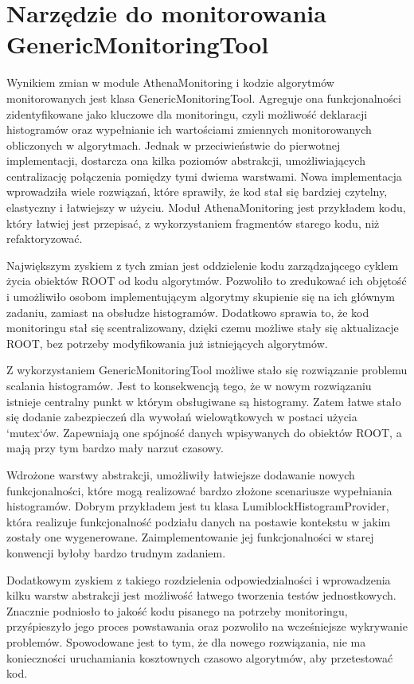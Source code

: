 \section{Narzędzie do monitorowania GenericMonitoringTool}
Wynikiem zmian w module AthenaMonitoring i kodzie algorytmów monitorowanych jest klasa GenericMonitoringTool.
Agreguje ona funkcjonalności zidentyfikowane jako kluczowe dla monitoringu, czyli możliwość deklaracji histogramów oraz wypełnianie ich wartościami zmiennych monitorowanych obliczonych w algorytmach.
Jednak w przeciwieństwie do pierwotnej implementacji, dostarcza ona kilka poziomów abstrakcji, umożliwiających centralizację połączenia pomiędzy tymi dwiema warstwami.
Nowa implementacja wprowadziła wiele rozwiązań, które sprawiły, że kod stał się bardziej czytelny, elastyczny i łatwiejszy w użyciu.
Moduł AthenaMonitoring jest przykładem kodu, który łatwiej jest przepisać, z wykorzystaniem fragmentów starego kodu, niż refaktoryzować. 

Największym zyskiem z tych zmian jest oddzielenie kodu zarządzającego cyklem życia obiektów ROOT od kodu algorytmów. 
Pozwoliło to zredukować ich objętość i umożliwiło osobom implementującym algorytmy skupienie się na ich głównym zadaniu, zamiast na obsłudze histogramów.
Dodatkowo sprawia to, że kod monitoringu stał się scentralizowany, dzięki czemu możliwe stały się aktualizacje ROOT, bez potrzeby modyfikowania już istniejących algorytmów.

Z wykorzystaniem GenericMonitoringTool możliwe stało się rozwiązanie problemu scalania histogramów.
Jest to konsekwencją tego, że w nowym rozwiązaniu istnieje centralny punkt w którym obsługiwane są histogramy.
Zatem łatwe stało się dodanie zabezpieczeń dla wywołań wielowątkowych w postaci użycia `mutex`ów.
Zapewniają one spójność danych wpisywanych do obiektów ROOT, a mają przy tym bardzo mały narzut czasowy.

Wdrożone warstwy abstrakcji, umożliwiły łatwiejsze dodawanie nowych funkcjonalności, które mogą realizować bardzo złożone scenariusze wypełniania histogramów.
Dobrym przykładem jest tu klasa LumiblockHistogramProvider, która realizuje funkcjonalność podziału danych na postawie kontekstu w jakim zostały one wygenerowane. 
Zaimplementowanie jej funkcjonalności w starej konwencji byłoby bardzo trudnym zadaniem. 

Dodatkowym zyskiem z takiego rozdzielenia odpowiedzialności i wprowadzenia kilku warstw abstrakcji jest możliwość łatwego tworzenia testów jednostkowych. 
Znacznie podniosło to jakość kodu pisanego na potrzeby monitoringu, przyśpieszyło jego proces powstawania oraz pozwoliło na wcześniejsze wykrywanie problemów.
Spowodowane jest to tym, że dla nowego rozwiązania, nie ma konieczności uruchamiania kosztownych czasowo algorytmów, aby przetestować kod.

